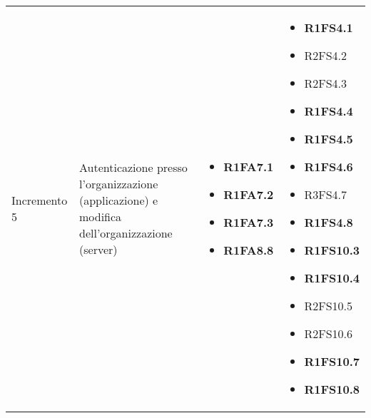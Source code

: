 {\begin{longtable}{C{3cm} C{4cm} C{4cm} C{4cm}}
Incremento 5 & Autenticazione presso l'organizzazione (applicazione) e modifica dell'organizzazione (server) & \begin{itemize}
    \item[ ] \textbf{R1FA7.1}
    \item[ ] \textbf{R1FA7.2}
    \item[ ] \textbf{R1FA7.3}
    \item[ ] \textbf{R1FA8.8}
\end{itemize} & \begin{itemize} 
    \item[ ] \textbf{R1FS4.1}
    \item[ ] R2FS4.2
    \item[ ] R2FS4.3
    \item[ ] \textbf{R1FS4.4}
    \item[ ] \textbf{R1FS4.5}
    \item[ ] \textbf{R1FS4.6}
    \item[ ] R3FS4.7
    \item[ ] \textbf{R1FS4.8}
    \item[ ] \textbf{R1FS10.3}
    \item[ ] \textbf{R1FS10.4}
    \item[ ] R2FS10.5
    \item[ ] R2FS10.6
    \item[ ] \textbf{R1FS10.7}
    \item[ ] \textbf{R1FS10.8}
\end{itemize}\\


\end{longtable}}
